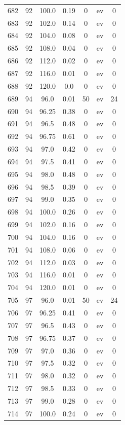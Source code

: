 \documentclass[12pt,a4paper]{article}
\begin{document}
\begin{tabular}{r|cccccc}
	682 & 92 & 100.0 & 0.19 & 0 & ev & 0 \\
	683 & 92 & 102.0 & 0.14 & 0 & ev & 0 \\
	684 & 92 & 104.0 & 0.08 & 0 & ev & 0 \\
	685 & 92 & 108.0 & 0.04 & 0 & ev & 0 \\
	686 & 92 & 112.0 & 0.02 & 0 & ev & 0 \\
	687 & 92 & 116.0 & 0.01 & 0 & ev & 0 \\
	688 & 92 & 120.0 & 0.0 & 0 & ev & 0 \\
	689 & 94 & 96.0 & 0.01 & 50 & ev & 24 \\
	690 & 94 & 96.25 & 0.38 & 0 & ev & 0 \\
	691 & 94 & 96.5 & 0.48 & 0 & ev & 0 \\
	692 & 94 & 96.75 & 0.61 & 0 & ev & 0 \\
	693 & 94 & 97.0 & 0.42 & 0 & ev & 0 \\
	694 & 94 & 97.5 & 0.41 & 0 & ev & 0 \\
	695 & 94 & 98.0 & 0.48 & 0 & ev & 0 \\
	696 & 94 & 98.5 & 0.39 & 0 & ev & 0 \\
	697 & 94 & 99.0 & 0.35 & 0 & ev & 0 \\
	698 & 94 & 100.0 & 0.26 & 0 & ev & 0 \\
	699 & 94 & 102.0 & 0.16 & 0 & ev & 0 \\
	700 & 94 & 104.0 & 0.16 & 0 & ev & 0 \\
	701 & 94 & 108.0 & 0.06 & 0 & ev & 0 \\
	702 & 94 & 112.0 & 0.03 & 0 & ev & 0 \\
	703 & 94 & 116.0 & 0.01 & 0 & ev & 0 \\
	704 & 94 & 120.0 & 0.01 & 0 & ev & 0 \\
	705 & 97 & 96.0 & 0.01 & 50 & ev & 24 \\
	706 & 97 & 96.25 & 0.41 & 0 & ev & 0 \\
	707 & 97 & 96.5 & 0.43 & 0 & ev & 0 \\
	708 & 97 & 96.75 & 0.37 & 0 & ev & 0 \\
	709 & 97 & 97.0 & 0.36 & 0 & ev & 0 \\
	710 & 97 & 97.5 & 0.32 & 0 & ev & 0 \\
	711 & 97 & 98.0 & 0.32 & 0 & ev & 0 \\
	712 & 97 & 98.5 & 0.33 & 0 & ev & 0 \\
	713 & 97 & 99.0 & 0.28 & 0 & ev & 0 \\
	714 & 97 & 100.0 & 0.24 & 0 & ev & 0 \\

\end{tabular}
\end{document}
